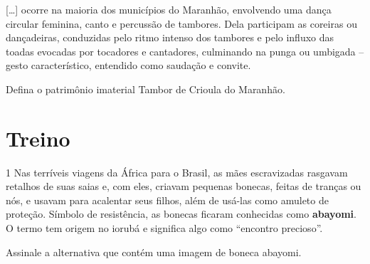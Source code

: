 \begin{myquote}
{[}\ldots{}{]} ocorre na maioria dos municípios do
Maranhão, envolvendo uma dança circular feminina, canto e percussão de
tambores. Dela participam as coreiras ou dançadeiras, conduzidas pelo
ritmo intenso dos tambores e pelo influxo das toadas evocadas por
tocadores e cantadores, culminando na punga ou umbigada – gesto
característico, entendido como saudação e convite.

\end{myquote}

Defina o patrimônio imaterial Tambor de Crioula do Maranhão.


\section*{Treino}

\num{1}  Nas terríveis viagens da África para o Brasil, as mães escravizadas
rasgavam retalhos de suas saias e, com eles, criavam pequenas bonecas, feitas
de tranças ou nós, e usavam para acalentar seus filhos, além de usá-las como
amuleto de proteção. Símbolo de resistência, as bonecas ficaram conhecidas
como \textbf{abayomi}. O termo tem origem no iorubá e significa algo como
“encontro precioso”.

Assinale a alternativa que contém uma imagem de boneca abayomi.

%

